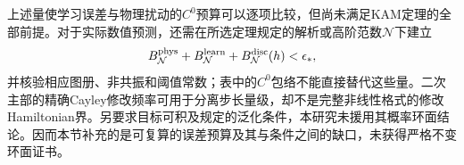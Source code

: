 上述量使学习误差与物理扰动的$C^0$预算可以逐项比较，但尚未满足KAM定理的全部前提。对于实际数值预测，还需在所选定理规定的解析或高阶范数$\mathcal N$下建立
\[
 B_{\mathcal N}^{\rm phys}+B_{\mathcal N}^{\rm learn}
       +B_{\mathcal N}^{\rm disc}(h)<\epsilon_*,
\]
并核验相应图册、非共振和阈值常数；表中的$C^0$包络不能直接替代这些量。二次主部的精确Cayley修改频率可用于分离步长量级，却不是完整非线性格式的修改Hamiltonian界。\citet[定理11]{Chen2022}另要求目标可积及规定的泛化条件，本研究未援用其概率环面结论。因而本节补充的是可复算的误差预算及其与条件之间的缺口，未获得严格不变环面证书。
